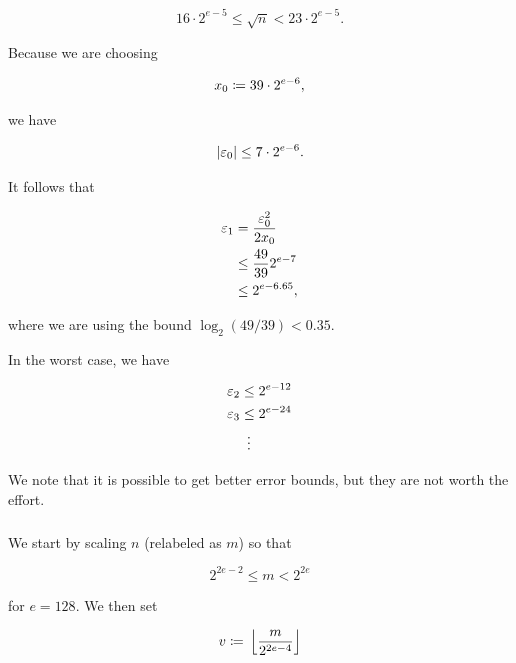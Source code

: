\begin{itemize}
\begin{equation}
    16\cdot2^{e-5} \le \sqrt{n} < 23\cdot2^{e-5}.
\end{equation}

\noindent
Because we are choosing

\begin{equation}
    x_{0} \coloneqq{} 39\cdot2^{e-6},
\end{equation}

\noindent
we have

\begin{equation}
    \left| \varepsilon_{0} \right| \le 7\cdot2^{e-6}.
\end{equation}

It follows that

\begin{align}
    \varepsilon_{1} &= \frac{\varepsilon_{0}^{2}}{2x_{0}} \nonumber\\
        &\le \frac{49}{39}2^{e-7} \nonumber\\
        &\le 2^{e-6.65},
\end{align}

\noindent
where we are using the bound $\log_{2}(49/39) < 0.35$.
\end{itemize}

In the worst case, we have

\begin{align}
    \varepsilon_{2} &\le 2^{e-12} \nonumber\\
    \varepsilon_{3} &\le 2^{e-24} \nonumber\\
        &\ \vdots
\end{align}

\noindent
We note that it is possible to get better error bounds,
but they are not worth the effort.


\subsubsection{\Linear{}}
\label{app:error_bounds:linear}

We start by scaling $n$ (relabeled as $m$) so that

\begin{equation}
    2^{2e-2} \le m < 2^{2e}
\end{equation}

\noindent
for $e = 128$.
We then set

\begin{equation}
    v \coloneqq{} \left\lfloor \frac{m}{2^{2e-4}} \right\rfloor
\end{equation}

